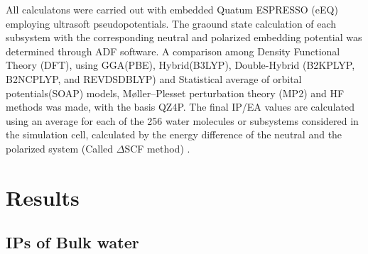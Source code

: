 \documentclass[12pt,a4paper]{article}
\begin{document}
All calculatons were carried out with embedded Quatum ESPRESSO (eEQ) employing ultrasoft pseudopotentials. The graound state calculation of each
subsystem with the corresponding neutral and polarized embedding potential was determined through ADF \cite{te2001chemistry} software. A comparison
among Density Functional Theory (DFT), using GGA(PBE), Hybrid(B3LYP), Double-Hybrid (B2KPLYP, B2NCPLYP, and REVDSDBLYP) and Statistical average of
orbital potentials(SOAP) models, Møller–Plesset perturbation theory (MP2) and HF methods was made, with the basis QZ4P. The final IP/EA values are
calculated using an average for each of the 256 water molecules or subsystems considered in the simulation cell, calculated by the energy difference
of the neutral and the polarized system (Called $\Delta$SCF method) \cite{bagus1965self,waskom2017mwaskom}.

\section{Results}
\subsection{IPs of Bulk water}
\end{document}
